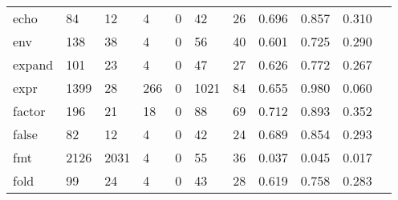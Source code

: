 \begin{longtable}{lp{1.10cm}p{1.10cm}p{1.10cm}p{1.10cm}p{1.10cm}p{1.10cm}p{1.10cm}p{1.10cm}p{1.10cm}p{1.10cm}}
echo      &                     84 &                                 12 &                                 4 &                                0 &                                42 &                              26 &                          0.696 &                                 0.857 &                               0.310 \\
env       &                    138 &                                 38 &                                 4 &                                0 &                                56 &                              40 &                          0.601 &                                 0.725 &                               0.290 \\
expand    &                    101 &                                 23 &                                 4 &                                0 &                                47 &                              27 &                          0.626 &                                 0.772 &                               0.267 \\
expr      &                   1399 &                                 28 &                               266 &                                0 &                              1021 &                              84 &                          0.655 &                                 0.980 &                               0.060 \\
factor    &                    196 &                                 21 &                                18 &                                0 &                                88 &                              69 &                          0.712 &                                 0.893 &                               0.352 \\
false     &                     82 &                                 12 &                                 4 &                                0 &                                42 &                              24 &                          0.689 &                                 0.854 &                               0.293 \\
fmt       &                   2126 &                               2031 &                                 4 &                                0 &                                55 &                              36 &                          0.037 &                                 0.045 &                               0.017 \\
fold      &                     99 &                                 24 &                                 4 &                                0 &                                43 &                              28 &                          0.619 &                                 0.758 &                               0.283 \\

\end{longtable}
